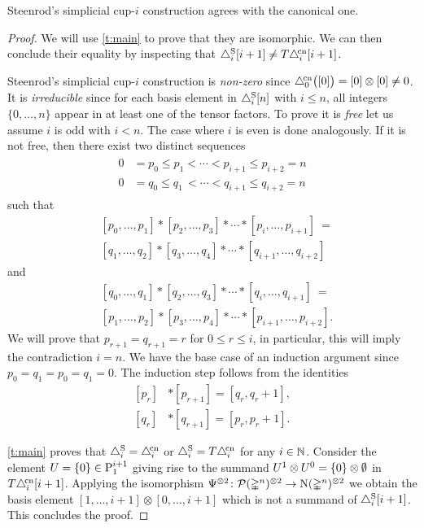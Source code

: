 \begin{theorem}\label{t:steenrod cup-i}
	Steenrod's simplicial \mbox{cup-$i$} construction agrees with the canonical one.
\end{theorem}

\begin{proof}
	We will use \cref{t:main} to prove that they are isomorphic.
	We can then conclude their equality by inspecting that $\triangle^{\mathrm{S}}_i [i+1] \neq T \triangle^{\!\mathrm{cn}}_i [i+1]$.

	Steenrod's simplicial \mbox{cup-$i$} construction is \emph{non-zero} since $\triangle^{\!\mathrm{cn}}_0\big([0]\big) = [0] \otimes [0] \neq 0$.
	It is \emph{irreducible} since for each basis element in $\triangle^{\mathrm{S}}_i [n]$ with $i \leq n$, all integers $\{0, \dots, n\}$ appear in at least one of the tensor factors.
	To prove it is \emph{free} let us assume $i$ is odd with $i < n$.
	The case where $i$ is even is done analogously.
	If it is not free, then there exist two distinct sequences
	\begin{align*}
	\begin{split}
	0 &= p_0 \leq p_1 < \cdots < p_{i+1} \leq p_{i+2} = n \\
	0 &= q_0 \leq q_1 \,< \cdots < q_{i+1} \leq q_{i+2} = n
	\end{split}
	\end{align*}
	such that
	\[
	\begin{split}
	&[ {p_0}, \dots, {p_1} ] \ast [ {p_2}, \dots, {p_3} ] \ast \cdots \ast [ {p_{i}}, \dots, {p_{i+1}} ]\ = \\
	&[ {q_1}, \dots, {q_2} ] \ast [ {q_3}, \dots, {q_4} ] \ast \cdots \ast [ {q_{i+1}}, \dots, {q_{i+2}} ]
	\end{split}
	\]
	and
	\[
	\begin{split}
	&[ {q_0}, \dots, {q_1} ] \ast [ {q_2}, \dots, {q_3} ] \ast \cdots \ast [ {q_{i}}, \dots, {q_{i+1}} ]\ = \\
	&[ {p_1}, \dots, {p_2} ] \ast [ {p_3}, \dots, {p_4} ] \ast \cdots \ast [ {p_{i+1}}, \dots, {p_{i+2}} ].
	\end{split}
	\]
	We will prove that $p_{r+1} = q_{r+1} = r$ for $0 \leq r \leq i$, in particular, this will imply the contradiction $i = n$.
	We have the base case of an induction argument since $p_0 = q_1 = p_0 = q_1 = 0$.
	The induction step follows from the identities
	\[
	\begin{split}
	[p_r] &\ast [p_{r+1}] = [q_r, q_{r}+1], \\
	[q_r] &\ast [q_{r+1}] = [p_r, p_{r}+1].
	\end{split}
	\]

	\cref{t:main} proves that $\triangle^{\mathrm{S}}_i = \triangle^{\!\mathrm{cn}}_i$ or $\triangle^{\mathrm{S}}_i = T \triangle^{\!\mathrm{cn}}_i$ for any $i \in \mathbb{N}$.
	Consider the element $U = \{0\} \in \mathrm{P}_{1}^{i+1}$ giving rise to the summand $U^1 \otimes U^0 = \{0\} \otimes \emptyset$ in $T \triangle^{\!\mathrm{cn}}_i [i+1]$.
	Applying the isomorphism $\Psi^{\otimes 2} \colon \mathcal{P}(\mathbb{\Delta}^n)^{\otimes 2} \to \operatorname{N}(\mathbb{\Delta}^n)^{\otimes 2}$ we obtain the basis element $[1,\dots,i+1] \otimes [0,\dots,i+1]$ which is not a summand of $\triangle^{\mathrm{S}}_i [i+1]$.
	This concludes the proof.
\end{proof}

